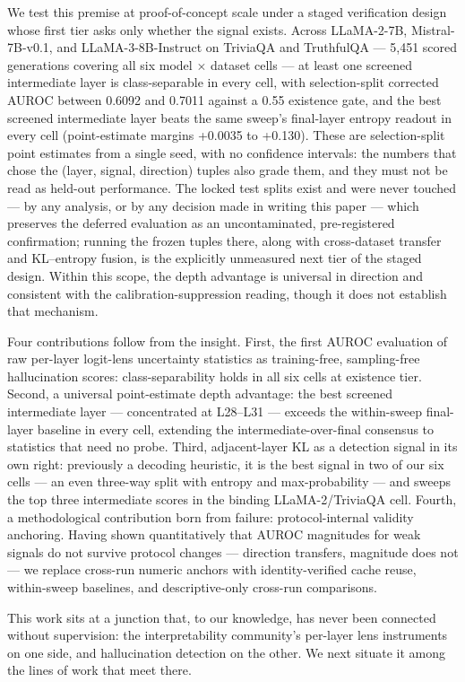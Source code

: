 We test this premise at proof-of-concept scale under a staged verification design whose first tier asks only whether the signal exists. Across LLaMA-2-7B, Mistral-7B-v0.1, and LLaMA-3-8B-Instruct on TriviaQA and TruthfulQA --- 5,451 scored generations covering all six model $\times$ dataset cells --- at least one screened intermediate layer is class-separable in every cell, with selection-split corrected AUROC between 0.6092 and 0.7011 against a 0.55 existence gate, and the best screened intermediate layer beats the same sweep's final-layer entropy readout in every cell (point-estimate margins +0.0035 to +0.130). These are selection-split point estimates from a single seed, with no confidence intervals: the numbers that chose the (layer, signal, direction) tuples also grade them, and they must not be read as held-out performance. The locked test splits exist and were never touched --- by any analysis, or by any decision made in writing this paper --- which preserves the deferred evaluation as an uncontaminated, pre-registered confirmation; running the frozen tuples there, along with cross-dataset transfer and KL--entropy fusion, is the explicitly unmeasured next tier of the staged design. Within this scope, the depth advantage is universal in direction and consistent with the calibration-suppression reading, though it does not establish that mechanism.

Four contributions follow from the insight. First, the first AUROC evaluation of raw per-layer logit-lens uncertainty statistics as training-free, sampling-free hallucination scores: class-separability holds in all six cells at existence tier. Second, a universal point-estimate depth advantage: the best screened intermediate layer --- concentrated at L28--L31 --- exceeds the within-sweep final-layer baseline in every cell, extending the intermediate-over-final consensus to statistics that need no probe. Third, adjacent-layer KL as a detection signal in its own right: previously a decoding heuristic, it is the best signal in two of our six cells --- an even three-way split with entropy and max-probability --- and sweeps the top three intermediate scores in the binding LLaMA-2/TriviaQA cell. Fourth, a methodological contribution born from failure: protocol-internal validity anchoring. Having shown quantitatively that AUROC magnitudes for weak signals do not survive protocol changes --- direction transfers, magnitude does not --- we replace cross-run numeric anchors with identity-verified cache reuse, within-sweep baselines, and descriptive-only cross-run comparisons.

This work sits at a junction that, to our knowledge, has never been connected without supervision: the interpretability community's per-layer lens instruments on one side, and hallucination detection on the other. We next situate it among the lines of work that meet there.

